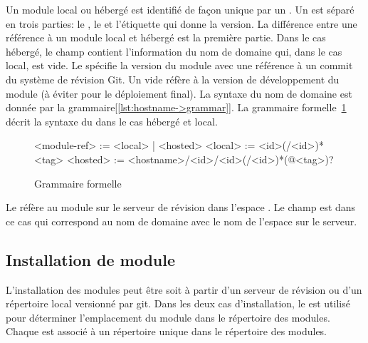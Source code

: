 Un module local ou hébergé est identifié de façon unique par un
.  Un  est séparé en trois parties: le
, le  et l'étiquette qui donne la version.  La
différence entre une référence à un module local et hébergé est la première
partie. Dans le cas hébergé, le champ  contient l'information
du nom de domaine qui, dans le cas local, est vide.  Le 
spécifie la version du module avec une référence à un commit du système de
révision Git. Un  vide réfère à la version de développement du
module (à éviter pour le déploiement final).  La syntaxe du nom de domaine est
donnée par la grammaire[\ref{lst:hostname->grammar}].  La grammaire
formelle~\ref{lst:module-ref->grammar} décrit la syntaxe du
 dans le cas hébergé et local.\\

\begin{figure}[ht]
  \lstset{frame=single}
  \begin{mplisting}{0.8}
<module-ref> := <local> | <hosted>
<local>      := <id>(/<id>)*<tag>
<hosted>     := <hostname>/<id>/<id>(/<id>)*(@<tag>)?
\end{mplisting}
  \caption{Grammaire formelle}
  \label{lst:module-ref->grammar}
\end{figure}

Le   réfère
au module  sur le serveur de révision 
dans l'espace . Le champ  est dans ce
cas  qui correspond au nom de domaine avec
le nom de l'espace sur le serveur.


\subsection{Installation de module}
L'installation des modules peut être soit à partir d'un serveur de révision
ou d'un répertoire local versionné par git. Dans les deux cas d'installation,
le   est utilisé pour déterminer l'emplacement du module
dans le répertoire des modules. Chaque  est associé à un
répertoire unique dans le répertoire des modules.

